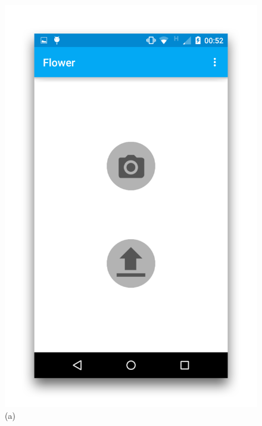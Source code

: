 \documentclass[11pt, a4paper]{report}
\begin{document}
\begin{figure}[h]
\centering
\begin{minipage}[b]{0.2\linewidth}
	\centering
	\includegraphics[totalheight=6cm]{img/47.png}
	(a)
\end{minipage}
\begin{minipage}[b]{0.2\linewidth}
	\centering

\end{minipage}
\end{figure}
\end{document}
